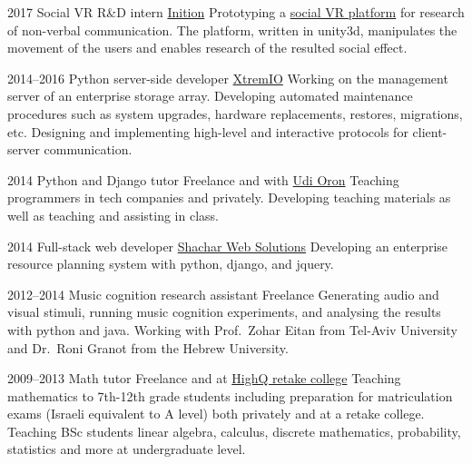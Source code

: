 \documentclass[]{friggeri-cv}
\begin{document}
\begin{entrylist}

    \entry
    {2017}
    {Social VR R\&D intern}
    {\href{https://www.inition.co.uk/}{Inition}}
    {
      Prototyping a \href{https://github.com/Nagasaki45/UnsocialVR/}{social VR platform} for research of non-verbal communication. The platform, written in unity3d, manipulates the movement of the users and enables research of the resulted social effect.
    }

\end{entrylist}
\begin{entrylist}

    \entry
    {2014--2016}
    {Python server-side developer}
    {\href{http://xtremio.com/}{XtremIO}}
    {
      Working on the management server of an enterprise storage array.
      Developing automated maintenance procedures such as system upgrades, hardware replacements, restores, migrations, etc.
      Designing and implementing high-level and interactive protocols for client-server communication.
    }

\end{entrylist}
\begin{entrylist}

    \entry
    {2014}
    {Python and Django tutor}
    {Freelance and with \href{http://www.10x.org.il/}{Udi Oron}}
    {
      Teaching programmers in tech companies and privately.
      Developing teaching materials as well as teaching and assisting in class.
    }

\end{entrylist}
\begin{entrylist}

    \entry
    {2014}
    {Full-stack web developer}
    {\href{http://www.shachar-web.co.il/eng/}{Shachar Web Solutions}}
    {
      Developing an enterprise resource planning system with python, django, and jquery.
    }

\end{entrylist}
\begin{entrylist}

    \entry
    {2012--2014}
    {Music cognition research assistant}
    {Freelance}
    {
      Generating audio and visual stimuli, running music cognition experiments, and analysing the results with python and java.
      Working with Prof.\ Zohar Eitan from Tel-Aviv University and Dr.\ Roni Granot from the Hebrew University.
    }

\end{entrylist}
\begin{entrylist}

    \entry
    {2009--2013}
    {Math tutor}
    {Freelance and at \href{https://www.high-q.co.il/}{HighQ retake college}}
    {
      Teaching mathematics to 7th-12th grade students including preparation for matriculation exams (Israeli equivalent to A level) both privately and at a retake college.
      Teaching BSc students linear algebra, calculus, discrete mathematics, probability, statistics and more at undergraduate level.
    }

\end{entrylist}
\end{document}
